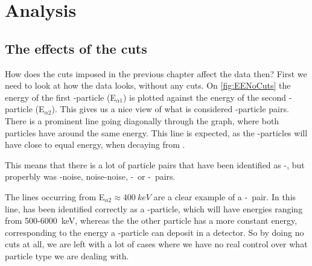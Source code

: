 \chapter{Analysis}
\section{The effects of the cuts}
How does the cuts imposed in the previous chapter affect the data then?
First we need to look at how the data looks, without any cuts. On \cref{fig:EENoCuts} the energy of the first \al-particle (E$_{\alpha1}$) is plotted against the energy of the second \al-particle (E$_{\alpha2}$).
This gives us a nice view of what is considered \al-particle pairs. There is a prominent line going diagonally through the graph, where both particles have around the same energy. This line is expected, as the \al-particles will have close to equal energy, when decaying from \ber. 

This means that there is a lot of particle pairs that have been identified as \al-\al, but properbly was \al-noise, noise-noise, \al-\be\ or \be-\be\ pairs. 

The lines occurring from E$_{\alpha2} \approx \SI{400}{keV}$ are a clear example of a \al-\be\ pair. In this line,  has been identified correctly as a \al-particle, which will have energies ranging from 500-\SI{6000}{keV}, whereas the the other particle has a more constant energy, corresponding to the energy a \be-particle can deposit in a detector. So by doing no cuts at all, we are left with a lot of cases where we have no real control over what particle type we are dealing with. 

